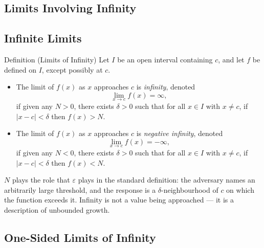 \subsection{Limits Involving Infinity}

\subsection*{Infinite Limits}

\begin{propositionbox}{Definition (Limits of Infinity)}
Let $I$ be an open interval containing $c$, and let $f$ be defined
on $I$, except possibly at $c$.
\begin{itemize}
  \item The limit of $f(x)$ as $x$ approaches $c$ is \emph{infinity},
        denoted
        \[
          \lim_{x \to c} f(x) = \infty,
        \]
        if given any $N > 0$, there exists $\delta > 0$ such that
        for all $x \in I$ with $x \neq c$, if $|x - c| < \delta$
        then $f(x) > N$.

  \item The limit of $f(x)$ as $x$ approaches $c$ is
        \emph{negative infinity}, denoted
        \[
          \lim_{x \to c} f(x) = -\infty,
        \]
        if given any $N < 0$, there exists $\delta > 0$ such that
        for all $x \in I$ with $x \neq c$, if $|x - c| < \delta$
        then $f(x) < N$.
\end{itemize}
\end{propositionbox}

\begin{remark*}[Intuition]
$N$ plays the role that $\varepsilon$ plays in the standard
definition: the adversary names an arbitrarily large threshold,
and the response is a $\delta$-neighbourhood of $c$ on which the
function exceeds it.
Infinity is not a value being approached --- it is a description
of unbounded growth.
\end{remark*}

\subsection*{One-Sided Limits of Infinity}

